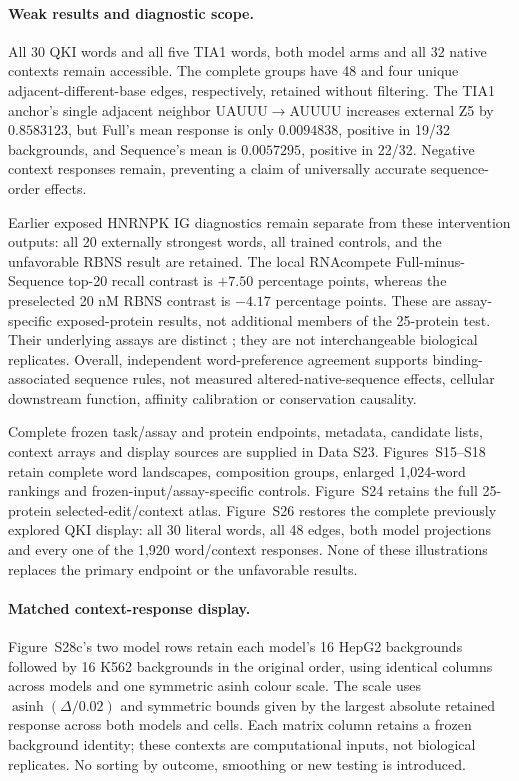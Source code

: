 \documentclass[11pt]{article}
\begin{document}
\paragraph{Weak results and diagnostic scope.}
All 30 QKI words and all five TIA1 words, both model arms and all 32 native contexts remain accessible. The complete groups have 48 and four unique adjacent-different-base edges, respectively, retained without filtering. The TIA1 anchor's single adjacent neighbor UAUUU\(\to\)AUUUU increases external Z5 by \(0.8583123\), but Full's mean response is only \(0.0094838\), positive in 19/32 backgrounds, and Sequence's mean is \(0.0057295\), positive in 22/32. Negative context responses remain, preventing a claim of universally accurate sequence-order effects.

Earlier exposed HNRNPK IG diagnostics remain separate from these intervention outputs: all 20 externally strongest words, all trained controls, and the unfavorable RBNS result are retained. The local RNAcompete Full-minus-Sequence top-20 recall contrast is \(+7.50\) percentage points, whereas the preselected 20 nM RBNS contrast is \(-4.17\) percentage points. These are assay-specific exposed-protein results, not additional members of the 25-protein test. Their underlying assays are distinct \citep{dominguez2018rbpcontext}; they are not interchangeable biological replicates. Overall, independent word-preference agreement supports binding-associated sequence rules, not measured altered-native-sequence effects, cellular downstream function, affinity calibration or conservation causality.

Complete frozen task/assay and protein endpoints, metadata, candidate lists, context arrays and display sources are supplied in Data S23. Figures~S15--S18 retain complete word landscapes, composition groups, enlarged 1,024-word rankings and frozen-input/assay-specific controls. Figure~S24 retains the full 25-protein selected-edit/context atlas. Figure~S26 restores the complete previously explored QKI display: all 30 literal words, all 48 edges, both model projections and every one of the 1,920 word/context responses. None of these illustrations replaces the primary endpoint or the unfavorable results.

\paragraph{Matched context-response display.} Figure~S28c's two model rows retain each model's 16 HepG2 backgrounds followed by 16 K562 backgrounds in the original order, using identical columns across models and one symmetric asinh colour scale. The scale uses $\operatorname{asinh}(\Delta/0.02)$ and symmetric bounds given by the largest absolute retained response across both models and cells. Each matrix column retains a frozen background identity; these contexts are computational inputs, not biological replicates. No sorting by outcome, smoothing or new testing is introduced.
\end{document}

